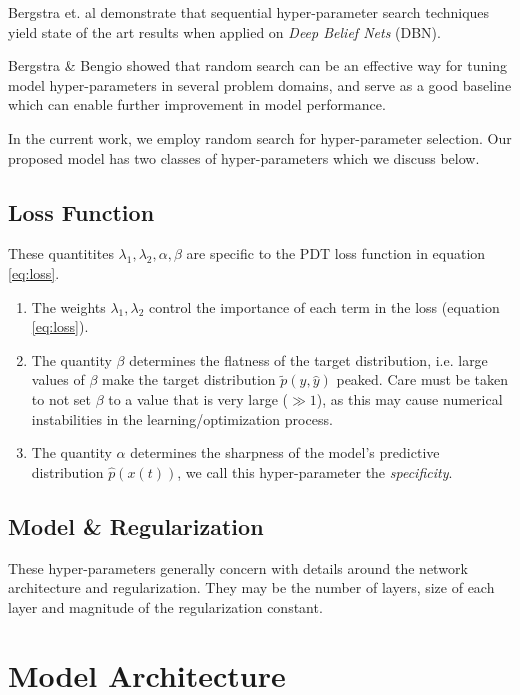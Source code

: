 \documentclass[envcountsect,runningheads]{llncs}
\theoremstyle{etoile}
\begin{document}
Bergstra et. al \cite{hypBengio} demonstrate that sequential hyper-parameter search techniques yield state of the art 
results when applied on \emph{Deep Belief Nets} (DBN). 

Bergstra \& Bengio \cite{randomsearchBengio} showed that random search can be an effective way for tuning model 
hyper-parameters in several problem domains, and serve as a good baseline which can enable 
further improvement in model performance.


In the current work, we employ random search for hyper-parameter selection. 
Our proposed model has two classes of hyper-parameters which we discuss below.

\subsection{Loss Function}

These quantitites $\lambda_1, \lambda_2, \alpha, \beta$ are specific to the PDT loss function in equation 
\ref{eq:loss}. 

\begin{enumerate}
\item The weights $\lambda_1, \lambda_2$ control the importance of each term in the loss (equation \ref{eq:loss}).
\item The quantity $\beta$ determines the flatness of the target distribution, i.e. large values of $\beta$ 
      make the target distribution $\tilde{p}(y, \hat{y})$ peaked. Care must be taken to not set $\beta$ to a value
      that is very large ($\gg 1$), as this may cause numerical instabilities in the learning/optimization process.
\item The quantity $\alpha$ determines the sharpness of the model's predictive distribution $\hat{p}(x(t))$, 
      we call this hyper-parameter the \emph{specificity}.        
\end{enumerate}
 

\subsection{Model \& Regularization}

These hyper-parameters generally concern with details around the network architecture and 
regularization. They may be the number of layers, size of each layer and magnitude of the 
regularization constant.



\section{Model Architecture}
\end{document}
